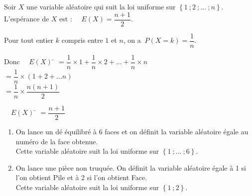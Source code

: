 \documentclass[a4paper,11pt,cours]{nsi} %
\begin{document}
\begin{propriete}[]
Soir $X$ une variable aléatoire qui suit la loi uniforme sur $\left\{1\ ; 2\ ; ... \ ; n\right\}$.\\
L'espérance de $X$ est : $\quad E(X)=\dfrac{n+1}{2}$.
\end{propriete}

\begin{demonstration}
    Pour tout entier $k$ compris entre $1$ et $n$, on a $\ P(X=k)=\dfrac{1}{n}$.
    \begin{tabbing}
        Donc $\quad E(X)$   \=  $=\dfrac{1}{n}\times 1+\dfrac{1}{n}\times 2 + ... +\dfrac{1}{n}\times n$\\[.5em]
        \>  $=\dfrac{1}{n}\times (1+2+...n)$\\[.5em]
        \>  $=\dfrac{1}{n}\times \dfrac{n(n+1)}{2}$
    \end{tabbing}
    \begin{tabbing}
        \phantom{Donc} $\quad E(X)$ \=  $=\dfrac{n+1}{2}$
    \end{tabbing}
\end{demonstration}

\begin{exemple}[s]
    \begin{enumerate}[label=\textbullet]
        \item On lance un dé équilibré à 6 faces et on définit la variable aléatoire égale au numéro de la face obtenue.\\
        Cette variable aléatoire suit la loi uniforme sur $\left\{1\ ; ...\ ;6\right\}$.
        \item On lance une pièce non truquée. On définit la variable aléatoire égale à 1 si l'on obtient Pile et à 2 si l'on obtient Face.\\
        Cette variable aléatoire suit la loi uniforme sur $\left\{1\ ;2\right\}$.
    \end{enumerate}
\end{exemple}
\end{document}
